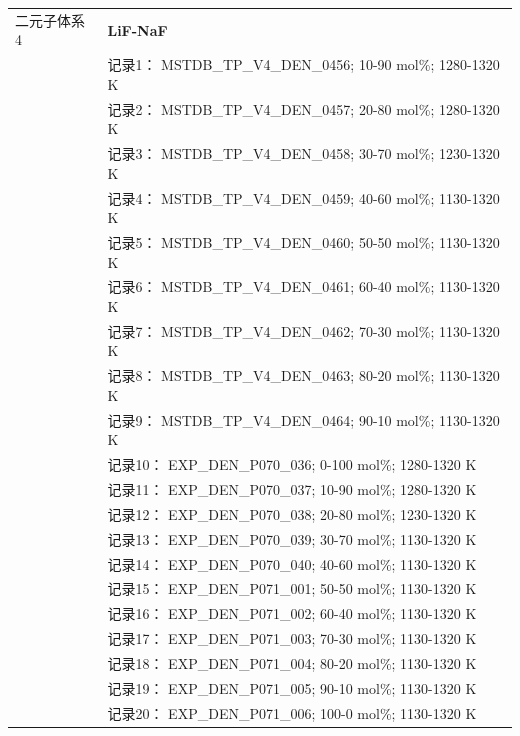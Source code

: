 \documentclass[12pt]{article}
\begin{document}
{\begin{longtable}[]{@{}
  >{\raggedright\arraybackslash}p{}
  >{\raggedright\arraybackslash}p{}@{}}
二元子体系 4  & \textbf{LiF-NaF} \\
 & 记录1： MSTDB\_TP\_V4\_DEN\_0456; 10-90 mol\%; 1280-1320 K \\
 & 记录2： MSTDB\_TP\_V4\_DEN\_0457; 20-80 mol\%; 1280-1320 K \\
 & 记录3： MSTDB\_TP\_V4\_DEN\_0458; 30-70 mol\%; 1230-1320 K \\
 & 记录4： MSTDB\_TP\_V4\_DEN\_0459; 40-60 mol\%; 1130-1320 K \\
 & 记录5： MSTDB\_TP\_V4\_DEN\_0460; 50-50 mol\%; 1130-1320 K \\
 & 记录6： MSTDB\_TP\_V4\_DEN\_0461; 60-40 mol\%; 1130-1320 K \\
 & 记录7： MSTDB\_TP\_V4\_DEN\_0462; 70-30 mol\%; 1130-1320 K \\
 & 记录8： MSTDB\_TP\_V4\_DEN\_0463; 80-20 mol\%; 1130-1320 K \\
 & 记录9： MSTDB\_TP\_V4\_DEN\_0464; 90-10 mol\%; 1130-1320 K \\
 & 记录10： EXP\_DEN\_P070\_036; 0-100 mol\%; 1280-1320 K \\
 & 记录11： EXP\_DEN\_P070\_037; 10-90 mol\%; 1280-1320 K \\
 & 记录12： EXP\_DEN\_P070\_038; 20-80 mol\%; 1230-1320 K \\
 & 记录13： EXP\_DEN\_P070\_039; 30-70 mol\%; 1130-1320 K \\
 & 记录14： EXP\_DEN\_P070\_040; 40-60 mol\%; 1130-1320 K \\
 & 记录15： EXP\_DEN\_P071\_001; 50-50 mol\%; 1130-1320 K \\
 & 记录16： EXP\_DEN\_P071\_002; 60-40 mol\%; 1130-1320 K \\
 & 记录17： EXP\_DEN\_P071\_003; 70-30 mol\%; 1130-1320 K \\
 & 记录18： EXP\_DEN\_P071\_004; 80-20 mol\%; 1130-1320 K \\
 & 记录19： EXP\_DEN\_P071\_005; 90-10 mol\%; 1130-1320 K \\
 & 记录20： EXP\_DEN\_P071\_006; 100-0 mol\%; 1130-1320 K  \\


\end{longtable}}
\end{document}
